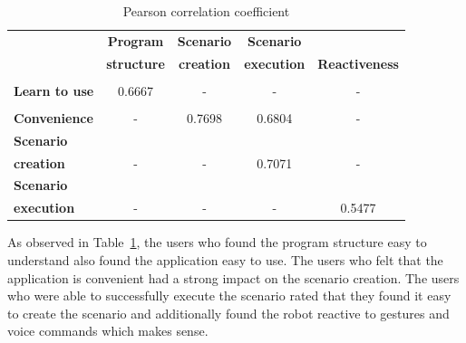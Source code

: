 \begin{table}[h]
\caption{Pearson correlation coefficient}
\label{table:correlation}
\begin{center}
\begin{tabular}{|l|c|c|c|c|}
\hline
  {} & \textbf{Program}& \textbf{Scenario}& \textbf{Scenario}& \textbf{}\\
    {} & \textbf{structure}& \textbf{creation}& \textbf{execution}& \textbf{Reactiveness}\\
\hline
{} & {} & {} & {} & {}\\
\textbf{Learn to use} & {0.6667} & {-} & {-} & {-}\\
\hline
{} & {} & {} & {} & {}\\
\textbf{Convenience} & {-} & {0.7698} & {0.6804} & {-}\\
\hline
\textbf{Scenario}  & {} & {} & {} & {}\\
\textbf{creation}  & {-} & {-} & {0.7071} & {-}\\
\hline
\textbf{Scenario} & {} & {} & {} & {}\\
\textbf{execution} & {-} & {-} & {-} & {0.5477}\\
\hline
\end{tabular}
\end{center}
\end{table}

 As observed in Table~\ref{table:correlation}, the users who found the program structure easy to understand also found the application easy to use. The users who felt that the application is convenient had a strong impact on the scenario creation. The users who were able to successfully execute the scenario rated that they found it easy to create the scenario and additionally found the robot reactive to gestures and voice commands which makes sense. 
 
